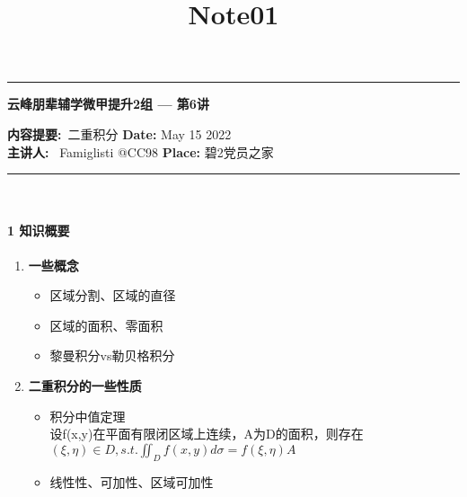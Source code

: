 \documentclass[12pt]{scrartcl}
\title{Note01}
\begin{document}
\begin{center}
	\hrule
	\vspace{.4cm}
	{\textbf { \large 云峰朋辈辅学微甲提升2组 --- 第6讲}}
\end{center}
{\textbf{内容提要:}\ 二重积分 \hspace{\fill} \textbf{Date:} May 15 2022    \\
{ \textbf{主讲人:}} \ Famiglisti @CC98  \hspace{\fill} \textbf{Place:} 碧2党员之家 \\
	\hrule
~\\


\paragraph*{\large 1 知识概要}
\begin{enumerate}
    \item  \textbf{一些概念}
        \begin{itemize}
        \item 区域分割、区域的直径
        \item 区域的面积、零面积
        \item 黎曼积分vs勒贝格积分   
        \end{itemize}

    \item \textbf{二重积分的一些性质}
        \begin{itemize}
            \item 积分中值定理\\
            设f(x,y)在平面有限闭区域上连续，A为D的面积，则存在
            $(\xi ,\eta )\in D,s.t. \iint _Df(x,y)d\sigma =f(\xi ,\eta)A$
            \item 线性性、可加性、区域可加性
        \end{itemize}


\end{enumerate}}
\end{document}
